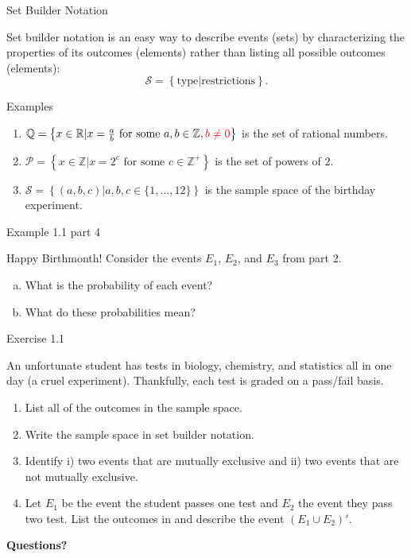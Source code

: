 \documentclass[aspectratio=169,xcolor=pdftex,dvipsnames,table]{beamer}\usepackage[]{graphicx}\usepackage[]{xcolor}
\begin{document}
\begin{frame}{Set Builder Notation}

  Set builder notation is an easy way to describe events (sets) by characterizing the properties of its outcomes (elements) rather than listing all possible outcomes (elements):
  \[
    \mathcal{S}=\left\{\mbox{type} |  \mbox{restrictions} \right\}.
  \]

  \pause
  
  \begin{block}{Examples}
    \begin{enumerate}
    \item $\mathbb Q = \left\{x \in \mathbb{R} | x=\frac{a}{b} \mbox{ for some } a,b \in \mathbb{Z}, \textcolor{red}{b\neq 0}\right\}$ is the set of rational numbers.
    \item $\mathcal P= \left\{x \in \mathbb{Z} | x=2^c \mbox{ for some } c \in \mathbb{Z}^+ \right\}$ is the set of powers of 2.
    \item $\mathcal S= \left\{(a,b,c) | a,b,c \in \{1,\ldots,12\} \right\}$ is the sample space of the birthday experiment.
    \end{enumerate}
  \end{block}
\end{frame}

\begin{frame}{Example 1.1 part 4}
  \begin{block}{Happy Birthmonth!}
    Consider the events $E_1$, $E_2$, and $E_3$ from part 2.
    \medskip
    
    \begin{enumerate}[a)]
    \item What is the probability of each event?
    \item What do these probabilities mean?
    \end{enumerate}
  \end{block}
\end{frame}

\begin{frame}{Exercise 1.1}

  An unfortunate student has tests in biology, chemistry, and statistics all in one day (a cruel experiment). Thankfully, each test is graded on a pass/fail basis. 
  
  \begin{enumerate}
  \item List all of the outcomes in the sample space.
  \item Write the sample space in set builder notation.
  \item Identify i) two events that are mutually exclusive and ii) two events that are not mutually exclusive.
  \item Let $E_1$ be the event the student passes one test and $E_2$ the event they pass two test. List the outcomes in and describe the event $(E_1 \cup E_2)'$.
  \end{enumerate}
\end{frame}

\begin{frame}
  \begin{center}
    \Large{\textbf{Questions?}}
  \end{center}
\end{frame}
\end{document}

